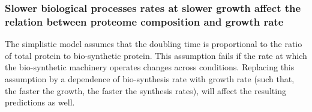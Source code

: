 \subsubsection{Slower biological processes rates at slower growth affect the relation between proteome composition and growth rate}
The simplistic model assumes that the doubling time is proportional to the ratio of total protein to bio-synthetic protein.
This assumption fails if the rate at which the bio-synthetic machinery operates changes across conditions.
Replacing this assumption by a dependence of bio-synthesis rate with growth rate (such that, the faster the growth, the faster the synthesis rates), will affect the resulting predictions as well.
